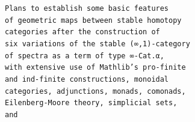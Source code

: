 \documentclass{book}
\theoremstyle{definition}
\begin{document}


\ \\

\begin{center}
\begin{tcolorbox}[width=5.8in,colback={white},coltitle=white]
\begin{center}
\ \\
\\
\ \\
\end{center}
\end{tcolorbox}
\end{center}
\ \\


\begin{center}
\begin{tcolorbox}[width=4.13in,colback={white},coltitle=white]
\end{tcolorbox}
\end{center}


\begin{center}
\texttt{Plans to establish some basic features}\\
\texttt{of geometric maps between stable homotopy}\\
\texttt{categories after the construction of}\\
\texttt{six variations of the stable (∞,1)-category}\\
\texttt{of spectra as a term of type ∞-Cat.α,}\\
\texttt{with extensive use of Mathlib's pro-finite}\\
\texttt{and ind-finite constructions, monoidal}\\
\texttt{categories, adjunctions, monads, comonads,}\\
\texttt{Eilenberg-Moore theory, simplicial sets,}\\
\texttt{and }
\end{center}
\end{document}
